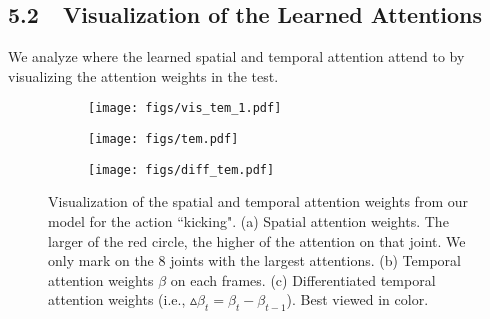 \documentclass[letterpaper]{article}
\begin{document}
\subsection{5.2~~Visualization of the Learned Attentions}
We analyze where the learned spatial and temporal attention attend to by visualizing the attention weights in the test.
\begin{figure}[http]
	\vspace{-3mm}
	\centering
	\begin{subfigure}[t]{0.36\textwidth}
		\centering\texttt{[image: figs/vis\_tem\_1.pdf]}
		\vspace{-2mm}
		\caption{}
		\label{fig:vis_tem_skeleton}
	\end{subfigure}
	
	\begin{subfigure}[t]{0.22\textwidth}
		\centering\texttt{[image: figs/tem.pdf]}
		\vspace{-2.2mm}
		\caption{}
		\label{fig:skeleton2}
	\end{subfigure}
	\begin{subfigure}[t]{0.22\textwidth}
		\centering\texttt{[image: figs/diff\_tem.pdf]}
		\vspace{-2.2mm}
		\caption{}
		\label{fig:skeleton2}
	\end{subfigure}
	\vspace{-4mm}
	\caption[]{Visualization of the spatial and temporal attention weights from our model for the action ``kicking". (a) Spatial attention weights. The larger of the red circle, the higher of the attention on that joint. We only mark on the 8 joints with the largest attentions. (b) Temporal attention weights $\beta$ on each frames. (c) Differentiated temporal attention weights (i.e., $\vartriangle\beta_t = \beta_t - \beta_{t-1}$). Best viewed in color.}\label{fig:discuss}
\end{figure}
\vspace{-2mm}

\begin{comment}
\begin{figure}[th]
	\vspace{-3mm}
	\begin{center}
		\texttt{[image: figs/vis\_tem.png]}
	\end{center}
	\vspace{-4mm}
	\caption{Visualization of spatial and temporal attention weights of ``Kicking" (top) and ``Pushing" (bottom). (a) to (f) show the spatial attention weights (marked by green circles, the larger of the circle, the higher of the attention intensity) on those frames. The right figure shows the temporal attention weights as the action proceeds. Best viewed in color.}
	\label{fig:discuss}
	\vspace{0mm}	
\end{figure}
\end{comment}
\end{document}
